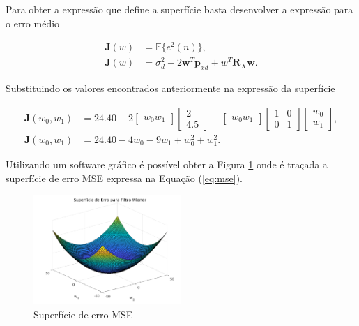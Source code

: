 \documentclass[a4paper,10pt]{article}
\begin{document}
\begin{enumerate}
\begin{enumerate}
						Para obter a expressão que define a superfície basta desenvolver a expressão para o erro médio
						
						\begin{align}
							\mathbf{J}(w) &= \mathbb{E}\{e^{2}(n)\}, \\
							\mathbf{J}(w) &= \sigma^{2}_{d} - 2\mathbf{w}^{T}\mathbf{p}_{xd} + w^{T}\mathbf{R}_{X}\mathbf{w}. \label{eq:mse}   
						\end{align}
						
						Substituindo os valores encontrados anteriormente na expressão da superfície
						
						\begin{align}
							\mathbf{J}(w_{0}, w_{1}) &= 24.40 - 2 \left[ \begin{matrix} w_{0}  w_{1} \end{matrix} \right] \left[ \begin{matrix} 2 \\ 4.5 \end{matrix} \right] + \left[ \begin{matrix} w_{0}  w_{1} \end{matrix} \right] \left[ \begin{matrix} 1 & 0 \\ 0 & 1 \end{matrix} \right]  \left[ \begin{matrix} w_{0}  \\ w_{1} \end{matrix} \right], \\
							\mathbf{J}(w_{0},w_{1}) &= 24.40 - 4w_{0} - 9w_{1} + w^{2}_{0} + w^{2}_{1}.
						\end{align}
						
						Utilizando um software gráfico é possível obter a Figura \ref{fig:01} onde é traçada a superfície de erro MSE expressa na Equação (\ref{eq:mse}).
					
						\begin{figure}[!ht]
							\centering
							\includegraphics[width=0.5\textwidth]{figs/superficie-de-erro.png}
							\caption{Superfície de erro MSE}
							\label{fig:01}
						\end{figure}
					
				\end{enumerate}
			
		\end{enumerate}
	
\end{document}
